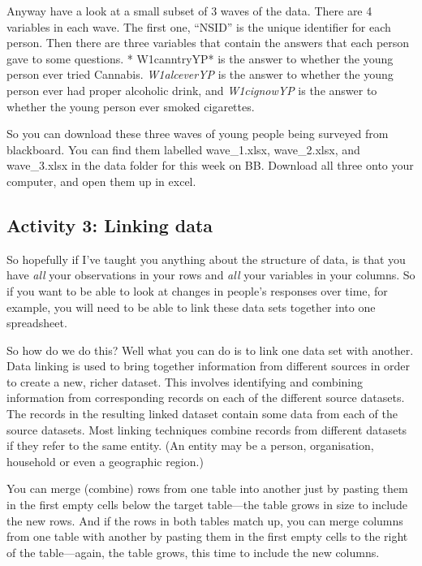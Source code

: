 \documentclass[]{book}
\theoremstyle{definition}
\theoremstyle{definition}
\theoremstyle{definition}
\theoremstyle{remark}
\begin{document}
Anyway have a look at a small subset of 3 waves of the data. There are 4
variables in each wave. The first one, ``NSID'' is the unique identifier
for each person. Then there are three variables that contain the answers
that each person gave to some questions. * W1canntryYP* is the answer to
whether the young person ever tried Cannabis. \emph{W1alceverYP} is the
answer to whether the young person ever had proper alcoholic drink, and
\emph{W1cignowYP} is the answer to whether the young person ever smoked
cigarettes.

So you can download these three waves of young people being surveyed
from blackboard. You can find them labelled wave\_1.xlsx, wave\_2.xlsx,
and wave\_3.xlsx in the data folder for this week on BB. Download all
three onto your computer, and open them up in excel.

\hypertarget{activity-3-linking-data}{%
\subsection{Activity 3: Linking data}\label{activity-3-linking-data}}

So hopefully if I've taught you anything about the structure of data, is
that you have \emph{all} your observations in your rows and \emph{all}
your variables in your columns. So if you want to be able to look at
changes in people's responses over time, for example, you will need to
be able to link these data sets together into one spreadsheet.

So how do we do this? Well what you can do is to link one data set with
another. Data linking is used to bring together information from
different sources in order to create a new, richer dataset. This
involves identifying and combining information from corresponding
records on each of the different source datasets. The records in the
resulting linked dataset contain some data from each of the source
datasets. Most linking techniques combine records from different
datasets if they refer to the same entity. (An entity may be a person,
organisation, household or even a geographic region.)

You can merge (combine) rows from one table into another just by pasting
them in the first empty cells below the target table---the table grows
in size to include the new rows. And if the rows in both tables match
up, you can merge columns from one table with another by pasting them in
the first empty cells to the right of the table---again, the table
grows, this time to include the new columns.
\end{document}
